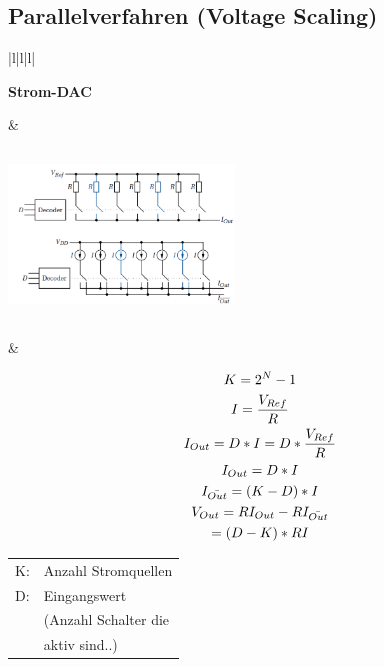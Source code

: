 \subsection{Parallelverfahren (Voltage Scaling)}
\begin{longtable}{|l|l|l|}
\hline
\begin{minipage}{4cm}
\textbf{Strom-DAC} 
\end{minipage}
&
\begin{minipage}{6cm}
\includegraphics[width=6cm, height = 4.5cm]{pictures/Strom-DAC}
\end{minipage}

&
\begin{minipage}{8cm}
\begin{gather}
K=2^N-1\\
I=\frac{V_{Ref}}{R}\\
I_{Out}=D*I=D*\frac{V_{Ref}}{R}\\
I_{Out}=D*I\\
I_{\bar{Out}}=(K-D)*I\\
V_{Out}=RI_{Out}-RI_{\bar{Out}}\notag\\=(D-K)*RI
\end{gather}
\begin{tabular}{ll}
K:&Anzahl Stromquellen\\
D:&Eingangswert\\&(Anzahl Schalter die \\&aktiv sind..)
\end{tabular}
\end{minipage}


\end{longtable}
